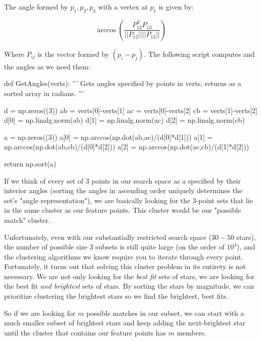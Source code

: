 \documentclass[paper=a4, fontsize=11pt]{scrartcl} %
\begin{document}
The angle formed by $p_1, p_2, p_3$ with a vertex at $p_1$ is given by:

$$\arccos\left(\frac{P_{12}^TP_{13}}{||P_{12}||||P_{13}||}\right)$$

Where $P_{ij}$ is the vector formed by $(p_i - p_j)$.
The following script computes and the angles as we need them:

\begin{python}
def GetAngles(verts):
    '''
    Gets angles specified by points in verts,
    returns as a sorted array in radians.
    '''
    
    d = np.zeros((3))
    ab = verts[0]-verts[1]
    ac = verts[0]-verts[2]
    cb = verts[1]-verts[2]
    d[0] = np.linalg.norm(ab)
    d[1] = np.linalg.norm(ac)
    d[2] = np.linalg.norm(cb)
    
    a = np.zeros((3))
    a[0] = np.arccos(np.dot(ab,ac)/(d[0]*d[1]))
    a[1] = np.arccos(np.dot(ab,cb)/(d[0]*d[2]))
    a[2] = np.arccos(np.dot(ac,cb)/(d[1]*d[2]))
    
    return np.sort(a)
\end{python}

If we think of every set of 3 points in our search space as a specified by their interior angles (sorting the angles in ascending order uniquely determines the set's "angle representation"), we are basically looking for the 3-point sets that lie in the same cluster as our feature points. This cluster would be our "possible match" cluster.


Unfortunately, even with our substantially restricted search space ($30-50$ stars), the number of possible size 3 subsets is still quite large (on the order of $10^4$), and the clustering algorithms we know require you to iterate through every point. Fortunately, it turns out that solving this cluster problem in its entirety is not necessary. We are not only looking for the \textit{best fit} sets of stars, we are looking for the best fit \textit{and brightest} sets of stars. By sorting the stars by magnitude, we can prioritize clustering the brightest stars so we find the brightest, best fits.

So if we are looking for $m$ possible matches in our subset, we can start with a much smaller subset of brightest stars and keep adding the next-brightest star until the cluster that contains our feature points has $m$ members.
\end{document}

